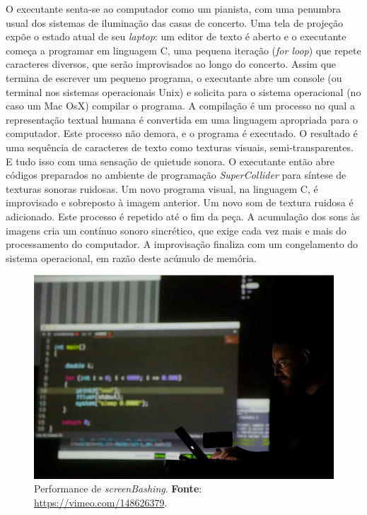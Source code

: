 O executante senta-se ao computador como um pianista, com uma penumbra usual dos sistemas de iluminação das casas de concerto. Uma tela de projeção expõe o estado atual de seu \emph{laptop}: um editor de texto é aberto e o executante começa a programar em linguagem C, uma pequena iteração (\emph{for loop}) que repete caracteres diversos, que serão improvisados ao longo do concerto. Assim que termina de escrever um pequeno programa, o executante abre um console (ou terminal nos sistemas operacionais Unix) e solicita para o sistema operacional (no caso um Mac OsX) compilar o programa. A compilação é um processo no qual a representação textual humana é convertida em uma linguagem apropriada para o computador. Este processo não demora, e o programa é executado. O resultado é uma sequência de caracteres de texto como texturas visuais, semi-transparentes. E tudo isso com uma sensação de quietude sonora.  O executante então abre códigos preparados no ambiente de programação  \emph{SuperCollider} para síntese de texturas sonoras ruidosas. Um novo programa visual, na linguagem C, é improvisado e sobreposto à imagem anterior. Um novo som de textura ruidosa é adicionado. Este processo é repetido até o fim da peça. A acumulação dos sons às imagens cria um contínuo sonoro sincrético, que exige cada vez mais e mais do processamento do computador. A improvisação finaliza com um congelamento do sistema operacional, em razão deste acúmulo de memória.

\begin{figure}[!h]
  \centering
  \includegraphics[scale=0.5]{imagens/screenbashing.png}
  \caption{Performance de \emph{screenBashing}. \textbf{Fonte}: \url{https://vimeo.com/148626379}.}
  \label{fig:screenbashing}
\end{figure}

